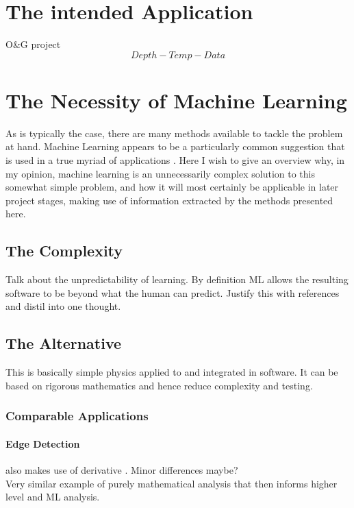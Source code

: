 \documentclass[main.tex]{subfiles}
\begin{document}
    
  \section{The intended Application}
    
    O\&G project
    \[Depth-Temp-Data\]
    
    \section{The Necessity of Machine Learning}
    
      As is typically the case, there are many methods available to tackle the problem at hand. Machine Learning appears to be a particularly common suggestion that is used in a true myriad of applications \cite{}. Here I wish to give an overview why, in my opinion, machine learning is an unnecessarily complex solution to this somewhat simple problem, and how it will most certainly be applicable in later project stages, making use of information extracted by the methods presented here.
      
      \subsection{The Complexity}
      
        Talk about the unpredictability of learning. By definition ML allows the resulting software to be beyond what the human can predict. Justify this with references and distil into one thought.
      
      \subsection{The Alternative}
      
        This is basically simple physics applied to and integrated in software. It can be based on rigorous mathematics and hence reduce complexity and testing.
      
      \subsubsection*{Comparable Applications}
      
        \paragraph{Edge Detection} %
        also makes use of derivative \cite{}. Minor differences maybe? \\
        Very similar example of purely mathematical analysis that then informs higher level and ML analysis.
      
\end{document}
